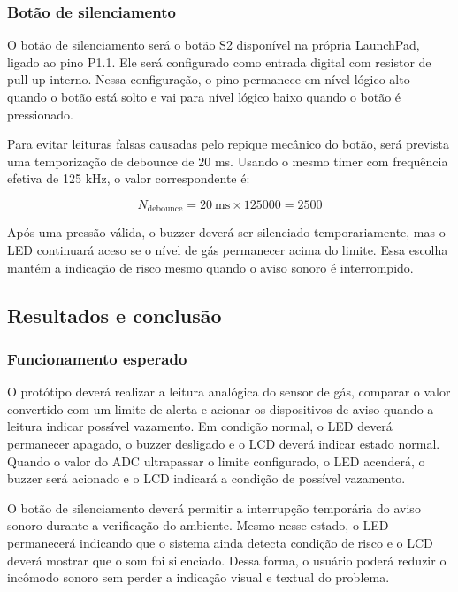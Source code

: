 \documentclass[11pt,a4paper]{article}
\numberwithin{equation}{section}
\begin{document}
\subsubsection{Botão de silenciamento}

O botão de silenciamento será o botão S2 disponível na própria LaunchPad, ligado ao pino P1.1. Ele
será configurado como entrada digital com resistor de pull-up interno. Nessa configuração, o pino
permanece em nível lógico alto quando o botão está solto e vai para nível lógico baixo quando o botão
é pressionado.

Para evitar leituras falsas causadas pelo repique mecânico do botão, será prevista uma temporização de
debounce de 20 ms. Usando o mesmo timer com frequência efetiva de 125 kHz, o valor correspondente é:

\begin{equation}
  N_{\text{debounce}} = 20\ \text{ms} \times 125000 = 2500
  \label{eq:debounce}
\end{equation}

Após uma pressão válida, o buzzer deverá ser silenciado temporariamente, mas o LED continuará aceso se
o nível de gás permanecer acima do limite. Essa escolha mantém a indicação de risco mesmo quando o
aviso sonoro é interrompido.

\subsection{Resultados e conclusão}

\subsubsection{Funcionamento esperado}

O protótipo deverá realizar a leitura analógica do sensor de gás, comparar o valor convertido com um
limite de alerta e acionar os dispositivos de aviso quando a leitura indicar possível vazamento. Em
condição normal, o LED deverá permanecer apagado, o buzzer desligado e o LCD deverá indicar estado
normal. Quando o valor do ADC ultrapassar o limite configurado, o LED acenderá, o buzzer será acionado
e o LCD indicará a condição de possível vazamento.

O botão de silenciamento deverá permitir a interrupção temporária do aviso sonoro durante a verificação
do ambiente. Mesmo nesse estado, o LED permanecerá indicando que o sistema ainda detecta condição de
risco e o LCD deverá mostrar que o som foi silenciado. Dessa forma, o usuário poderá reduzir o incômodo
sonoro sem perder a indicação visual e textual do problema.
\end{document}
